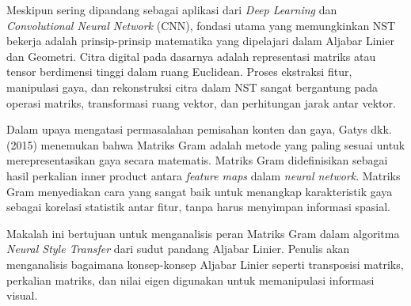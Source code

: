 Meskipun sering dipandang sebagai aplikasi dari \textit{Deep Learning} dan \textit{Convolutional Neural Network} (CNN), fondasi utama yang memungkinkan NST bekerja adalah prinsip-prinsip matematika yang dipelajari dalam Aljabar Linier dan Geometri. Citra digital pada dasarnya adalah representasi matriks atau tensor berdimensi tinggi dalam ruang Euclidean. Proses ekstraksi fitur, manipulasi gaya, dan rekonstruksi citra dalam NST sangat bergantung pada operasi matriks, transformasi ruang vektor, dan perhitungan jarak antar vektor.

Dalam upaya mengatasi permasalahan pemisahan konten dan gaya, Gatys dkk. (2015) menemukan bahwa Matriks Gram adalah metode yang paling sesuai untuk merepresentasikan gaya secara matematis. Matriks Gram didefinisikan sebagai hasil perkalian inner product antara \textit{feature maps} dalam \textit{neural network}. Matriks Gram menyediakan cara yang sangat baik untuk menangkap karakteristik gaya sebagai korelasi statistik antar fitur, tanpa harus menyimpan informasi spasial. 

Makalah ini bertujuan untuk menganalisis peran Matriks Gram dalam algoritma \textit{Neural Style Transfer} dari sudut pandang Aljabar Linier. 
Penulis akan menganalisis bagaimana konsep-konsep Aljabar Linier seperti transposisi matriks, perkalian matriks, dan nilai eigen digunakan untuk memanipulasi informasi visual. 
